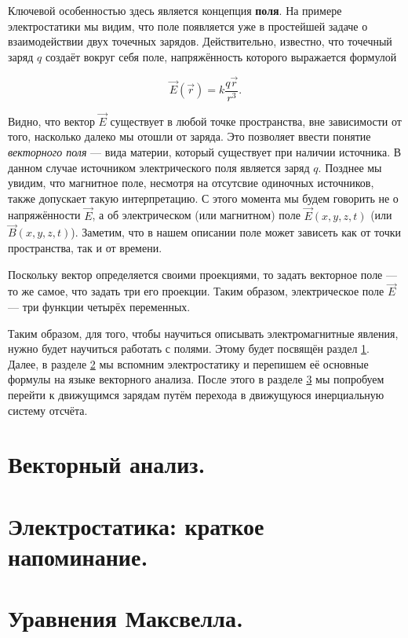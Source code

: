 \documentclass[a4paper,12pt]{article}
\begin{document}
Ключевой особенностью здесь является концепция \textbf{поля}. На
примере электростатики мы видим, что поле появляется уже в простейшей
задаче о взаимодействии двух точечных зарядов. Действительно,
известно, что точечный заряд $q$ создаёт вокруг себя поле,
напряжённость которого выражается формулой 

\begin{equation}
  \label{eq:q_E}
  \vec{E} (\vec{r}) = k \frac{q \vec{r}}{r^3}.
\end{equation}

Видно, что вектор $\vec{E}$ существует в любой точке пространства, вне
зависимости от того, насколько далеко мы отошли от заряда. Это
позволяет ввести понятие \textit{векторного поля} --- вида материи,
который существует при наличии источника. В данном случае источником
электрического поля является заряд $q$. Позднее мы увидим, что
магнитное поле, несмотря на отсутсвие одиночных источников, также
допускает такую интерпретацию. С этого момента мы будем говорить не о
напряжённости $\vec{E}$, а об электрическом (или магнитном) поле
$\vec{E}(x,y,z,t)$ (или $\vec{B}(x,y,z,t)$). Заметим, что в нашем
описании поле может зависеть как от точки пространства, так и от
времени.

Поскольку вектор определяется своими проекциями, то задать векторное
поле --- то же самое, что задать три его проекции. Таким образом,
электрическое поле $\vec{E}$ --- три функции четырёх переменных. 

Таким образом, для того, чтобы научиться описывать электромагнитные
явления, нужно будет научиться работать с полями. Этому будет посвящён
раздел \ref{sec:vector_analysis}. Далее, в разделе
\ref{sec:electrostatics} мы вспомним электростатику и перепишем её
основные формулы на языке векторного анализа. После этого в разделе
\ref{sec:maxwell} мы попробуем перейти к движущимся зарядам путём
перехода в движущуюся инерциальную систему отсчёта.

\section{Векторный анализ.}
\label{sec:vector_analysis}

\section{Электростатика: краткое напоминание.}
\label{sec:electrostatics}

\section{Уравнения Максвелла.}
\label{sec:maxwell}
\end{document}
